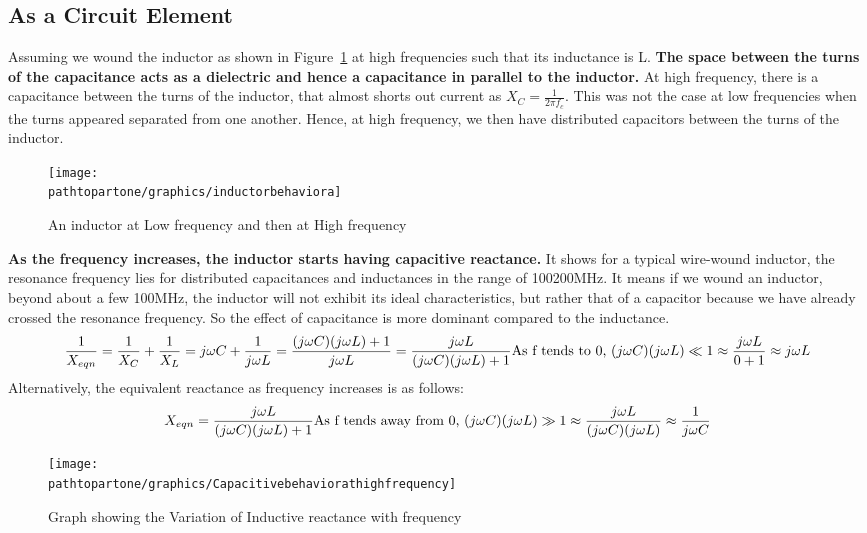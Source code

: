\subsection{As a Circuit Element}\label{sec:circuitelement}

Assuming we wound the inductor as shown in Figure~\ref{fig:group10diagram3} at high frequencies such that its inductance is L. \textbf{The space between the turns of the capacitance acts as a dielectric and hence a capacitance in parallel to the inductor.} At high frequency, there is a capacitance between the turns of the inductor, that almost shorts out current as $X_{C} = \frac{1}{2\pi f_c}$. This was not the case at low frequencies when the turns appeared separated from one another. Hence, at high frequency, we then have distributed capacitors between the turns of the inductor.
\begin{figure}[h]
\centering
\texttt{[image: \\pathtopartone/graphics/inductorbehaviora]}
\caption{An inductor at Low frequency and then at High frequency}
\label{fig:group10diagram3}
\end{figure}

\textbf{As the frequency increases, the inductor starts having capacitive reactance.} It shows for a typical wire-wound inductor, the resonance frequency lies for distributed capacitances and inductances in the range of 100\textemdash\;200MHz. It means if we wound an inductor, beyond about a few 100MHz, the inductor will not exhibit its ideal characteristics, but rather that of a capacitor because we have already crossed the resonance frequency. So the effect of capacitance is more dominant compared to the inductance.
\begin{dmath*}
\frac{1}{X_{eqn}} = \frac{1}{X_C} + \frac{1}{X_L}
= j\omega C + \frac{1}{j\omega L}
= \frac{(j\omega C)(j\omega L) + 1}{j\omega L}
= \frac{j\omega L}{(j\omega C)(j\omega L) + 1}\newline
\text{As f tends to 0, $(j\omega C)(j\omega L)\ll 1$}
\approx\frac{j\omega L}{0 + 1}
\approx j\omega L       
\end{dmath*}
Alternatively, the equivalent reactance as frequency increases is as follows:
\begin{dmath*}	
X_{eqn} = \frac{j\omega L}{(j\omega C)(j\omega L) + 1}\newline
\text{As f tends away from 0, $(j\omega C)(j\omega L)\gg 1$}
\approx\frac{j\omega L}{(j\omega C)(j\omega L)}
\approx\frac{1}{j\omega C}
\end{dmath*}
\begin{figure}[h]
\centering
\texttt{[image: \\pathtopartone/graphics/Capacitivebehaviorathighfrequency]}
\caption{Graph showing the Variation of Inductive reactance with frequency}
\label{fig:Capacitivebehaviorathighfrequency}
\end{figure}

